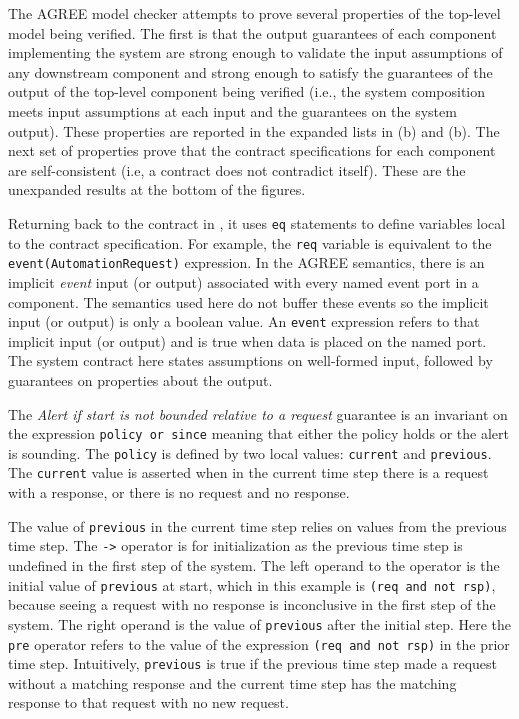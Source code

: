 The AGREE model checker attempts to prove several properties of the top-level model being verified. The first is that the output guarantees of each component implementing the system are strong enough to validate the input assumptions of any downstream component and strong enough to satisfy the guarantees of the output of the top-level component being verified (i.e., the system composition meets input assumptions at each input and the guarantees on the system output). These properties are reported in the expanded lists in (b) and (b).  The next set of properties prove that the contract specifications for each component are self-consistent (i.e, a contract does not contradict itself). These are the unexpanded results at the bottom of the figures.

Returning back to the contract in , it uses \texttt{eq} statements to define variables local to the contract specification. For example, the \texttt{req} variable is equivalent to the \texttt{event(AutomationRequest)} expression. In the AGREE semantics, there is an implicit \emph{event} input (or output) associated with every named event port in a component. The semantics used here do not buffer these events so the implicit input (or output) is only a boolean value. An \texttt{event} expression refers to that implicit input (or output) and is true when data is placed on the named port. The system contract here states assumptions on well-formed input, followed by guarantees on properties about the output.

The \emph{Alert if start is not bounded relative to a request} guarantee is an invariant on the expression \texttt{policy or since} meaning that either the policy holds or the alert is sounding. The \texttt{policy} is defined by two local values: \texttt{current} and \texttt{previous}. The \texttt{current} value is asserted when in the current time step there is a request with a response, or there is no request and no response.  

The value of \texttt{previous} in the current time step relies on values from the previous time step. The \texttt{->} operator is for initialization as the previous time step is undefined in the first step of the system. The left operand to the operator is the initial value of \texttt{previous} at start, which in this example is \texttt{(req and not rsp)}, because seeing a request with no response is inconclusive in the first step of the system. The right operand is the value of \texttt{previous} after the initial step. Here the \texttt{pre} operator refers to the value of the expression \texttt{(req and not rsp)} in the prior time step. Intuitively, \texttt{previous} is true if the previous time step made a request without a matching response and the current time step has the matching response to that request with no new request.

